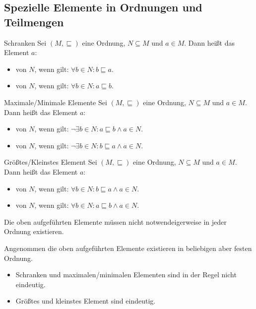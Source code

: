 \documentclass{paper}
\begin{document}
\subsection{Spezielle Elemente in Ordnungen und Teilmengen}

\begin{definition}{Schranken}
Sei $(M, ⊑)$ eine Ordnung, $N ⊆ M$ und $a ∈ M$.
Dann heißt das Element $a$:
\begin{itemize}
\item {} von $N$, wenn gilt: $∀ b ∈ N: b ⊑ a$.
\item {} von $N$, wenn gilt: $∀ b ∈ N: a ⊑ b$.
\end{itemize}
\end{definition}

\begin{definition}{Maximale/Minimale Elemente}
Sei $(M, ⊑)$ eine Ordnung, $N ⊆ M$ und $a ∈ M$.
Dann heißt das Element $a$:
\begin{itemize}
\item {} von $N$, wenn gilt: $¬∃ b ∈ N: a ⊑ b ∧ a ∈ N$.
\item {} von $N$, wenn gilt: $¬∃ b ∈ N: b ⊑ a ∧ a ∈ N$.
\end{itemize}
\end{definition}

\begin{definition}{Größtes/Kleinstes Element}
Sei $(M, ⊑)$ eine Ordnung, $N ⊆ M$ und $a ∈ M$.
Dann heißt das Element $a$:
\begin{itemize}
\item {} von $N$, wenn gilt: $∀ b ∈ N: b ⊑ a ∧ a ∈ N$.
\item {} von $N$, wenn gilt: $∀ b ∈ N: a ⊑ b ∧ a ∈ N$.
\end{itemize}
\end{definition}

\begin{remark}
Die oben aufgeführten Elemente müssen nicht notwendeigerweise in jeder Ordnung
existieren.
\end{remark}

\begin{remark}
Angenommen die oben aufgeführten Elemente existieren in beliebigen aber festen
Ordnung.
\begin{itemize}
\item Schranken und maximalen/minimalen Elementen sind in der Regel nicht eindeutig.
\item Größtes und kleinstes Element sind eindeutig.
\end{itemize}
\end{remark}
\end{document}

